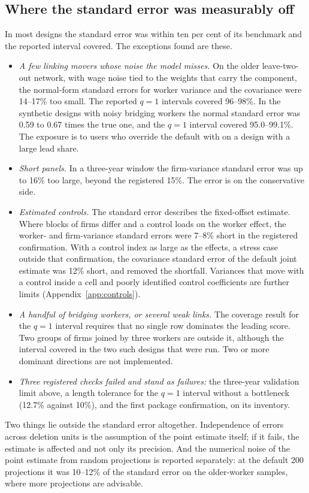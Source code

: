 \subsection{Where the standard error was measurably off}
In most designs the standard error was within ten per cent of its benchmark and the
reported interval covered. The exceptions found are these.
\begin{itemize}
\item \emph{A few linking movers whose noise the model misses.} On the older
leave-two-out network, with wage noise tied to the weights that carry the component,
the normal-form standard errors for worker variance and the covariance were 14--17\%
too small. The reported $q=1$ intervals covered 96--98\%. In the synthetic designs with
noisy bridging workers the normal standard error was 0.59 to 0.67 times the true one,
and the $q=1$ interval covered 95.0--99.1\%. The exposure is to users who override the
default with  on a design with a large lead share.
\item \emph{Short panels.} In a three-year window the firm-variance standard error was
up to 16\% too large, beyond the registered 15\%. The error is on the conservative
side.
\item \emph{Estimated controls.} The standard error describes the fixed-offset
estimate. Where blocks of firms differ and a control loads on the worker effect, the
worker- and firm-variance standard errors were 7--8\% short in the registered
confirmation. With a control index as large as the effects, a stress case outside
that confirmation, the covariance standard error of the default joint estimate was
12\% short, and  removed the shortfall. Variances that
move with a control inside a cell and poorly identified control coefficients are
further limits (Appendix~\ref{app:controls}).
\item \emph{A handful of bridging workers, or several weak links.} The coverage result
for the $q=1$ interval requires that no single row dominates the leading score. Two
groups of firms joined by three workers are outside it, although the interval covered
in the two such designs that were run. Two or more dominant directions are not
implemented.
\item \emph{Three registered checks failed and stand as failures:} the three-year
validation limit above, a length tolerance for the $q=1$ interval without a
bottleneck (12.7\% against 10\%), and the first package confirmation, on its
inventory.
\end{itemize}
Two things lie outside the standard error altogether. Independence of errors across
deletion units is the assumption of the point estimate itself; if it fails, the
estimate is affected and not only its precision. And the numerical noise of the point
estimate from random projections is reported separately: at the default 200
projections it was 10--12\% of the standard error on the older-worker samples, where
more projections are advisable.


